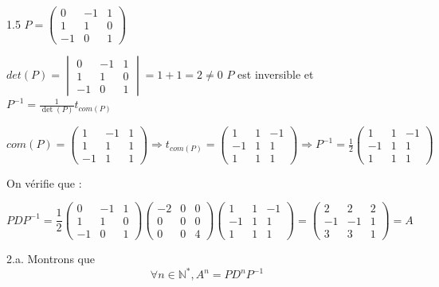\documentclass[12pt]{article}
\begin{document}
\begin{spacing}{1.5}
$P=\begin{pmatrix}
0  & -1 & 1 \\ 
1  & 1  & 0 \\ 
-1 & 0  & 1
\end{pmatrix} $

$det(P)=\begin{vmatrix}
0  & -1 & 1 \\ 
1  & 1  & 0 \\ 
-1 & 0  & 1
\end{vmatrix} = 1+1=2\neq 0$ $P$ est inversible et $P^{-1}=\frac{1}{\det(P)}t_{com(P)}$

$com(P)=\begin{pmatrix}
1  & -1 & 1 \\ 
1  & 1  & 1 \\ 
-1 & 1  & 1
\end{pmatrix}\Rightarrow t_{com(P)}=\begin{pmatrix}
1  & 1 & -1 \\ 
-1  & 1  & 1 \\ 
1 & 1  & 1
\end{pmatrix} \Rightarrow P^{-1}=\frac{1}{2} \begin{pmatrix}
1  & 1 & -1 \\ 
-1  & 1  & 1 \\ 
1 & 1  & 1
\end{pmatrix}$

On vérifie que :

\[PDP^{-1}=\frac{1}{2}\begin{pmatrix}
0  & -1 & 1 \\ 
1  & 1  & 0 \\ 
-1 & 0  & 1
\end{pmatrix}\begin{pmatrix}
-2 & 0& 0 \\ 
0 & 0 & 0 \\ 
0 & 0 & 4
\end{pmatrix}\begin{pmatrix}
1  & 1 & -1 \\ 
-1  & 1  & 1 \\ 
1 & 1  & 1
\end{pmatrix}=\begin{pmatrix}
2 & 2& 2 \\ 
-1 & -1 & 1 \\ 
3 & 3 & 1
\end{pmatrix}=A\]

2.a. Montrons que 
\[
\forall {n\in\mathbb{N}^*}, A^n = PD^nP^{-1}
\]


\end{spacing}
\end{document}
